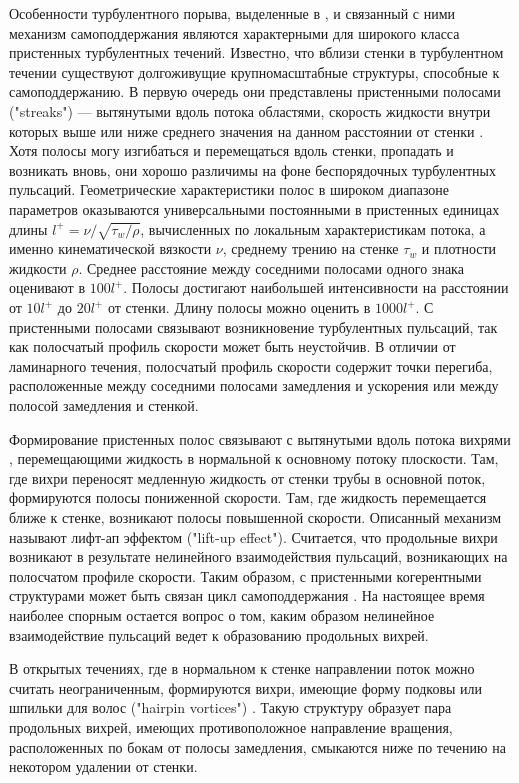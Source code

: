Особенности турбулентного порыва, выделенные в \cite{Shimizu2009}, и связанный с ними механизм самоподдержания являются характерными для широкого класса пристенных турбулентных течений. Известно, что вблизи стенки в турбулентном течении существуют долгоживущие крупномасштабные структуры, способные к самоподдержанию. В первую очередь они представлены пристенными полосами ("streaks") --- вытянутыми вдоль потока областями, скорость жидкости внутри которых выше или ниже среднего значения на данном расстоянии от стенки \cite{Klebanoff1962, Kline1967}. Хотя полосы могу изгибаться и перемещаться вдоль стенки, пропадать и возникать вновь, они хорошо различимы на фоне беспорядочных турбулентных пульсаций. Геометрические характеристики полос в широком диапазоне параметров оказываются универсальными постоянными в пристенных единицах длины $l^+ = \nu / \sqrt{\tau_{w} / \rho}$, вычисленных по локальным характеристикам потока, а именно кинематической вязкости $\nu$, среднему трению на стенке $\tau_{w}$ и плотности жидкости $\rho$. Среднее расстояние между соседними полосами одного знака оценивают в $100 l^+$. Полосы достигают наибольшей интенсивности на расстоянии от $10 l^+$ до $20 l^+$ от стенки. Длину полосы можно оценить в $1000 l^+$. С пристенными полосами связывают возникновение турбулентных пульсаций, так как полосчатый профиль скорости может быть неустойчив. В отличии от ламинарного течения, полосчатый профиль скорости содержит точки перегиба, расположенные между соседними полосами замедления и ускорения или между полосой замедления и стенкой. 

Формирование пристенных полос связывают с вытянутыми вдоль потока вихрями \cite{Blackwelder1979, Jeong1997}, перемещающими жидкость в нормальной к основному потоку плоскости. Там, где вихри переносят медленную жидкость от стенки трубы в основной поток, формируются полосы пониженной скорости. Там, где жидкость перемещается ближе к стенке, возникают полосы повышенной скорости. Описанный механизм называют лифт-ап эффектом ("lift-up effect"). Считается, что продольные вихри возникают в результате нелинейного взаимодействия пульсаций, возникающих на полосчатом профиле скорости. Таким образом, с пристенными когерентными структурами может быть связан цикл самоподдержания \cite{Hamilton1995, Waleffe1997, Schoppa2002, Kawahara2003}. На настоящее время наиболее спорным остается вопрос о том, каким образом нелинейное взаимодействие пульсаций ведет к образованию продольных вихрей. 

В открытых течениях, где в нормальном к стенке направлении поток можно считать неограниченным, формируются вихри, имеющие форму подковы или шпильки для волос ("hairpin vortices") \cite{Head1981, Robinson1991, Adrian2000, Adrian2007}. Такую структуру образует пара продольных вихрей, имеющих противоположное направление вращения, расположенных по бокам от полосы замедления, смыкаются ниже по течению на некотором удалении от стенки. 

